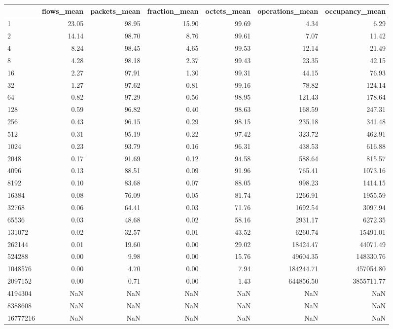 \begin{tabular}{lrrrrrr}
\toprule
 & flows_mean & packets_mean & fraction_mean & octets_mean & operations_mean & occupancy_mean \\
\midrule
1 & 23.05 & 98.95 & 15.90 & 99.69 & 4.34 & 6.29 \\
2 & 14.14 & 98.70 & 8.76 & 99.61 & 7.07 & 11.42 \\
4 & 8.24 & 98.45 & 4.65 & 99.53 & 12.14 & 21.49 \\
8 & 4.28 & 98.18 & 2.37 & 99.43 & 23.35 & 42.15 \\
16 & 2.27 & 97.91 & 1.30 & 99.31 & 44.15 & 76.93 \\
32 & 1.27 & 97.62 & 0.81 & 99.16 & 78.82 & 124.14 \\
64 & 0.82 & 97.29 & 0.56 & 98.95 & 121.43 & 178.64 \\
128 & 0.59 & 96.82 & 0.40 & 98.63 & 168.59 & 247.31 \\
256 & 0.43 & 96.15 & 0.29 & 98.15 & 235.18 & 341.48 \\
512 & 0.31 & 95.19 & 0.22 & 97.42 & 323.72 & 462.91 \\
1024 & 0.23 & 93.79 & 0.16 & 96.31 & 438.53 & 616.88 \\
2048 & 0.17 & 91.69 & 0.12 & 94.58 & 588.64 & 815.57 \\
4096 & 0.13 & 88.51 & 0.09 & 91.96 & 765.41 & 1073.16 \\
8192 & 0.10 & 83.68 & 0.07 & 88.05 & 998.23 & 1414.15 \\
16384 & 0.08 & 76.09 & 0.05 & 81.74 & 1266.91 & 1955.59 \\
32768 & 0.06 & 64.41 & 0.03 & 71.76 & 1692.54 & 3097.94 \\
65536 & 0.03 & 48.68 & 0.02 & 58.16 & 2931.17 & 6272.35 \\
131072 & 0.02 & 32.57 & 0.01 & 43.52 & 6260.74 & 15491.01 \\
262144 & 0.01 & 19.60 & 0.00 & 29.02 & 18424.47 & 44071.49 \\
524288 & 0.00 & 9.98 & 0.00 & 15.76 & 49604.35 & 148330.76 \\
1048576 & 0.00 & 4.70 & 0.00 & 7.94 & 184244.71 & 457054.80 \\
2097152 & 0.00 & 0.71 & 0.00 & 1.43 & 644856.50 & 3855711.77 \\
4194304 & NaN & NaN & NaN & NaN & NaN & NaN \\
8388608 & NaN & NaN & NaN & NaN & NaN & NaN \\
16777216 & NaN & NaN & NaN & NaN & NaN & NaN \\
\bottomrule
\end{tabular}

